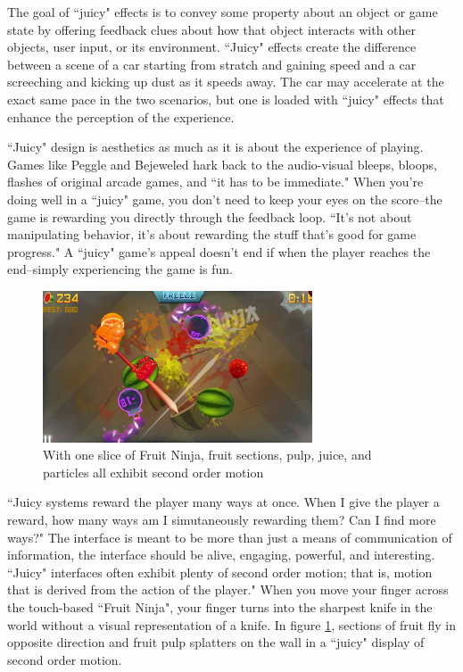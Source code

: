 The goal of ``juicy" effects is to convey some property about an object or game state by offering feedback clues about how that object interacts with other objects, user input, or its environment. ``Juicy" effects create the difference between a scene of a car starting from stratch and gaining speed and a car screeching and kicking up dust as it speeds away. The car may accelerate at the exact same pace in the two scenarios, but one is loaded with ``juicy" effects that enhance the perception of the experience.

``Juicy" design is aesthetics as much as it is about the experience of playing. Games like Peggle and Bejeweled hark back to the audio-visual bleeps, bloops, flashes of original arcade games, and ``it has to be immediate." \cite{popcap2012} When you're doing well in a ``juicy" game, you don't need to keep your eyes on the score--the game is rewarding you directly through the feedback loop. ``It's not about manipulating behavior, it's about rewarding the stuff that's good for game progress." \cite{popcap2012} A ``juicy" game's appeal doesn't end if when the player reaches the end--simply experiencing the game is fun.

\begin{figure}
\begin{center}
\includegraphics[width=80mm]{images/ninja.pdf}
\caption{With one slice of Fruit Ninja, fruit sections, pulp, juice, and particles all exhibit second order motion}
\label{fig:ninja}
\end{center}
\end{figure}

``Juicy systems reward the player many ways at once. When I give the player a reward, how many ways am I simutaneously rewarding them? Can I find more ways?" \cite{schell2008art} The interface is meant to be more than just a means of communication of information, the interface should be alive, engaging, powerful, and interesting. ``Juicy" interfaces often exhibit plenty of second order motion; that is, motion that is derived from the action of the player." \cite{schell2008art} When you move your finger across the touch-based ``Fruit Ninja", your finger turns into the sharpest knife in the world without a visual representation of a knife. In figure \ref{fig:ninja}, sections of fruit fly in opposite direction and fruit pulp splatters on the wall in a ``juicy" display of second order motion. 

